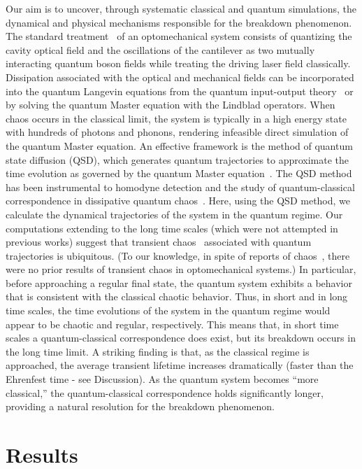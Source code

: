 \documentclass[12pt]{wlscirep}
\begin{document}
Our aim is to uncover, through systematic classical and quantum 
simulations, the dynamical and physical mechanisms responsible for the 
breakdown phenomenon. The standard treatment~\cite{AKM:2014} of an 
optomechanical system consists of quantizing the cavity optical field 
and the oscillations of the cantilever as two mutually interacting 
quantum boson fields while treating the driving laser field classically. 
Dissipation associated with the optical and mechanical
fields can be incorporated into the quantum Langevin equations from the
quantum input-output theory~\cite{GZ:book} or by solving the quantum Master
equation with the Lindblad operators. When chaos occurs in the classical limit,
the system is typically in a high energy state with hundreds of photons 
and phonons, rendering infeasible direct simulation of the quantum 
Master equation. An effective framework is the method of quantum state
diffusion (QSD), which generates quantum trajectories to
approximate the time evolution as governed by the quantum Master
equation~\cite{GP:1992,GP:1993a,GP:1993b}. The QSD method has been
instrumental to homodyne detection and the study of quantum-classical 
correspondence in dissipative quantum chaos~\cite{BPS:1996,BHJS:2002,KP:2008}. 
Here, using the QSD method, we calculate the dynamical trajectories 
of the system in the quantum regime. Our computations extending to 
the long time scales (which were not attempted in previous works) 
suggest that transient chaos~\cite{LT:book} associated with quantum 
trajectories is ubiquitous. (To our knowledge, in spite of reports of
chaos~\cite{CV:2007,CCV:2007,AKM:2014}, there were no prior results of
transient chaos in optomechanical systems.) In particular, before 
approaching a regular final state, the quantum system exhibits a behavior 
that is consistent with the classical chaotic behavior. Thus, in short and 
in long time scales, the time evolutions of the system in the quantum regime 
would appear to be chaotic and regular, respectively. This means that, 
in short time scales a quantum-classical correspondence does exist, but 
its breakdown occurs in the long time limit. A striking finding is that, 
as the classical regime is approached, the average transient lifetime 
increases dramatically (faster than the Ehrenfest time - see Discussion). 
As the quantum system becomes ``more classical,'' the quantum-classical 
correspondence holds significantly longer, providing a natural 
resolution for the breakdown phenomenon. 

\section*{Results} \label{sec:results}
\end{document}
